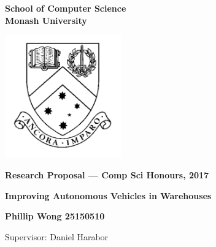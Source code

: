 \documentclass[a4paper,11pt]{article}
\begin{document}
\thispagestyle{empty} %
\renewcommand{\thepage}{\roman{page}}

\begin{spacing}{1.5}
\begin{center}
{\Large \bfseries
School of Computer Science \\
Monash University}

\vspace*{30mm}

\includegraphics[width=5cm]{MonashCrest.pdf}

\vspace*{15mm}

{\large \bfseries
Research Proposal --- Comp Sci Honours, 2017
}

\vspace*{10mm}

{\LARGE \bfseries
Improving Autonomous Vehicles in Warehouses
}

\vspace*{20mm}

{\large \bfseries
Phillip Wong 25150510

\vspace*{20mm}


Supervisor: Daniel Harabor
}

\end{center}
\end{spacing}

\newpage

\tableofcontents

\newpage
\setcounter{page}{1}
\renewcommand{\thepage}{\arabic{page}}

	\begin{abstract} %
	\noindent \textbf{TODO} Warehouse Automation is a cooperative multi-agent pathfinding problem where a number of agents are individually moving inventory from shelves to a picking station.
	
	This project will be looking at two aspects which we suspect will decrease complexity of the pathfinding.
	
	First, is the configuration of the warehouse. 
	
	Second, is the positioning of the inventory.
	
	Lastly, we will look at improving on existing cooperative pathfinding techniques - specifically Conflict-Oriented Windowed Hierarchical Cooperative A∗.
	
	
\end{abstract}
\end{document}
